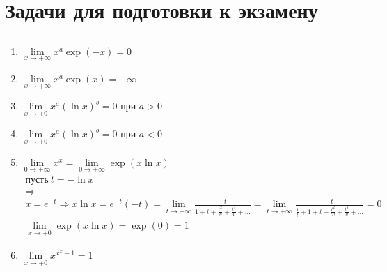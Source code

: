 \newpage		
	\section{Задачи для подготовки к экзамену}
		\subsection{}
		\begin{enumerate}
			\item $\lim\limits_{x \to +\infty} x^{a} \exp(-x) = 0$
			\item $\lim\limits_{x \to +\infty} x^{a} \exp(x) = +\infty$
			\item $\lim\limits_{x \to +0} x^{a}(\ln x)^{b}=0$ при $a > 0$
			\item $\lim\limits_{x \to +0} x^{a}(\ln x)^{b}=0$ при $a < 0$
			\item $\lim\limits_{0 \to +\infty} x^{x} = \lim\limits_{0 \to +\infty} \exp(x \ln x)$
				\begin{gather*}
					\text{пусть}\ t = -\ln x \\
					\Rightarrow \\
					x = e^{-t} \Rightarrow x \ln x = e^{-t} (-t) = \lim\limits_{t \to +\infty} \frac{-t}{1 +t + \frac{t^2}{2!} + \frac{t^3}{3!} + \ldots} = \lim\limits_{t \to +\infty} \frac{-t}{\frac{1}{t} + 1 + t + \frac{t^2}{2!} + \frac{t^3}{3!} + \ldots} = 0\\
					\lim\limits_{x \to +0} \exp(x \ln x) = \exp(0) = 1
				\end{gather*}
			\item $\lim\limits_{x \to +0} x^{x^{x} - 1} = 1$	
		\end{enumerate}		
			
	

